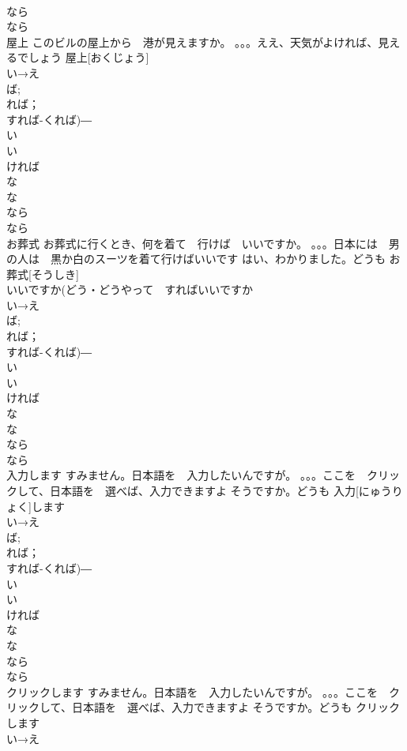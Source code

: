 \documentclass[8pt]{extreport}
\begin{document}
\begin{CJK}{UTF8}{min}
\\	なら　
\\	なら
\\	屋上	このビルの屋上から　港が見えますか。 。。。ええ、天気がよければ、見えるでしょう	屋上[おくじょう]			
\\	い→え
\\	ば;
\\	れば；
\\	すれば-くれば)―　
\\	い
\\	い　
\\	ければ　
\\	な 
\\	な
\\	なら　
\\	なら
\\	お葬式	お葬式に行くとき、何を着て　行けば　いいですか。 。。。日本には　男の人は　黒か白のスーツを着て行けばいいです はい、わかりました。どうも	お 葬式[そうしき]			
\\	いいですか(どう・どうやって　すればいいですか　
\\	い→え
\\	ば;
\\	れば；
\\	すれば-くれば)―　
\\	い
\\	い　
\\	ければ　
\\	な 
\\	な
\\	なら　
\\	なら
\\	入力します	すみません。日本語を　入力したいんですが。 。。。ここを　クリックして、日本語を　選べば、入力できますよ そうですか。どうも	入力[にゅうりょく]します			
\\	い→え
\\	ば;
\\	れば；
\\	すれば-くれば)―　
\\	い
\\	い　
\\	ければ　
\\	な 
\\	な
\\	なら　
\\	なら
\\	クリックします	すみません。日本語を　入力したいんですが。 。。。ここを　クリックして、日本語を　選べば、入力できますよ そうですか。どうも	クリックします			
\\	い→え

\end{CJK}
\end{document}

